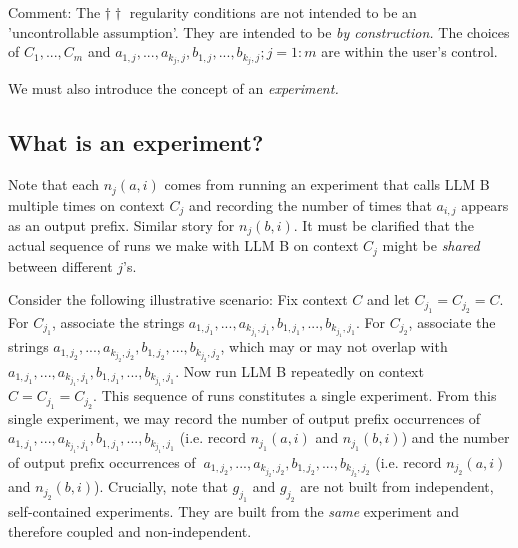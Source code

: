 \documentclass{article}
\begin{document}
Comment: The $\displaystyle \dagger \dagger $ regularity conditions are not intended to be an 'uncontrollable assumption'. They are intended to be \textit{by construction.} The choices of $\displaystyle C_{1} ,...,C_{m}$ and $\displaystyle a_{1,j} ,...,a_{k_{j} ,j} ,b_{1,j} ,...,b_{k_{j} ,j} ;j=1:m$ are within the user's control.



We must also introduce the concept of an \textit{experiment.}



\subsection{What is an experiment?}

Note that each $\displaystyle n_{j}\left( a,i\right)$ comes from running an experiment that calls LLM B multiple times on context $\displaystyle C_{j}$ and recording the number of times that $\displaystyle a_{i,j}$ appears as an output prefix. Similar story for $\displaystyle n_{j}\left( b,i\right)$. It must be clarified that the actual sequence of runs we make with LLM B on context $\displaystyle C_{j}$ might be \textit{shared} between different $\displaystyle j$'s.



Consider the following illustrative scenario: Fix context $\displaystyle C$ and let $\displaystyle C_{j_{1}} =C_{j_{2}} =C$. For $\displaystyle C_{j_{1}}$, associate the strings $\displaystyle a_{1,j_{1}} ,...,a_{k_{j_{1}} ,j_{1}} ,b_{1,j_{1}} ,...,b_{k_{j_{1}} ,j_{1}}$. For $\displaystyle C_{j_{2}}$, associate the strings $\displaystyle a_{1,j_{2}} ,...,a_{k_{j_{2}} ,j_{2}} ,b_{1,j_{2}} ,...,b_{k_{j_{2}} ,j_{2}}$, which may or may not overlap with $\displaystyle a_{1,j_{1}} ,...,a_{k_{j_{1}} ,j_{1}} ,b_{1,j_{1}} ,...,b_{k_{j_{1}} ,j_{1}}$. Now run LLM B repeatedly on context $\displaystyle C=C_{j_{1}} =C_{j_{2}}$. This sequence of runs constitutes a single experiment. From this single experiment, we may record the number of output prefix occurrences of $\displaystyle a_{1,j_{1}} ,...,a_{k_{j_{1}} ,j_{1}} ,b_{1,j_{1}} ,...,b_{k_{j_{1}} ,j_{1}}$ (i.e. record $\displaystyle n_{j_{1}}\left( a,i\right)$ and $\displaystyle n_{j_{1}}\left( b,i\right)$) and the number of output prefix occurrences of $\displaystyle \ a_{1,j_{2}} ,...,a_{k_{j_{2}} ,j_{2}} ,b_{1,j_{2}} ,...,b_{k_{j_{2}} ,j_{2}}$ (i.e. record $\displaystyle n_{j_{2}}\left( a,i\right)$ and $\displaystyle n_{j_{2}}\left( b,i\right)$). Crucially, note that $\displaystyle g_{j_{1}}$ and $\displaystyle g_{j_{2}}$ are not built from independent, self-contained experiments. They are built from the \textit{same} experiment and therefore coupled and non-independent.
\end{document}

